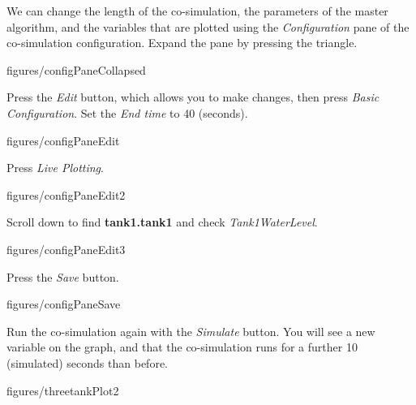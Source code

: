 \documentclass[11pt,a4paper]{../tutorial}
\begin{document}
\begin{instructions}
\item We can change the length of the co-simulation, the parameters of the master algorithm, and the variables that are plotted using the \emph{Configuration} pane of the co-simulation configuration. Expand the pane by pressing the triangle.

    \begin{annotation}[width=0.84\linewidth,trim=0 405 0 0,clip]{figures/configPaneCollapsed}
    \end{annotation}

\item Press the \emph{Edit} button, which allows you to make changes, then press \emph{Basic Configuration}. Set the \emph{End time} to 40 (seconds).

    \begin{annotation}[width=0.84\linewidth,trim=0 100 0 0,clip]{figures/configPaneEdit}
    \end{annotation}

\item Press \emph{Live Plotting}.

    \begin{annotation}[width=0.84\linewidth,trim=0 350 0 0,clip]{figures/configPaneEdit2}
    \end{annotation}

Scroll down to find \textbf{{tank1}.tank1} and check \emph{Tank1WaterLevel}.

    \begin{annotation}[width=0.84\linewidth,trim=0 250 0 200,clip]{figures/configPaneEdit3}
    \end{annotation}

\item Press the \emph{Save} button.

    \begin{annotation}[width=0.84\linewidth,trim=0 0 0 370,clip]{figures/configPaneSave}
    \end{annotation}

\item Run the co-simulation again with the \emph{Simulate} button. You will see a new variable on the graph, and that the co-simulation runs for a further 10 (simulated) seconds than before.

    \begin{annotation}[width=0.84\linewidth]{figures/threetankPlot2}
    \end{annotation}

\end{instructions}
\end{document}
